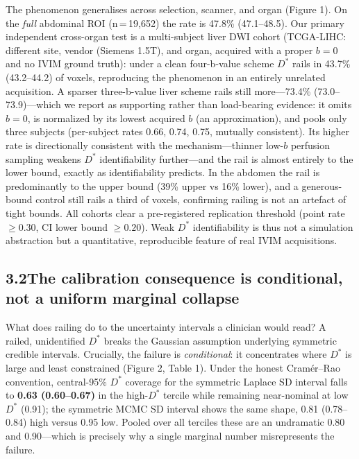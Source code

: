 \documentclass[11pt]{article}
\newcommand{\Dstar}{\ensuremath{D^{*}}}
\begin{document}
The phenomenon generalises across selection, scanner, and organ (Figure 1). On the
\emph{full} abdominal ROI (n\,=\,19{,}652) the rate is 47.8\% (47.1--48.5). Our
primary independent cross-organ test is a multi-subject liver DWI cohort (TCGA-LIHC:
different site, vendor (Siemens 1.5T), and organ, acquired with a proper $b=0$ and no
IVIM ground truth): under a clean four-b-value scheme \Dstar{} rails in 43.7\%
(43.2--44.2) of voxels, reproducing the phenomenon in an entirely unrelated acquisition.
A sparser three-b-value liver scheme rails still more---73.4\% (73.0--73.9)---which we
report as supporting rather than load-bearing evidence: it omits $b=0$, is normalized by
its lowest acquired $b$ (an approximation), and pools only three subjects (per-subject
rates 0.66, 0.74, 0.75, mutually consistent). Its higher rate is directionally consistent
with the mechanism---thinner low-$b$ perfusion sampling weakens \Dstar{} identifiability
further---and the rail is almost entirely to the lower bound, exactly as identifiability
predicts. In the abdomen the rail is predominantly
to the upper bound (39\% upper vs 16\% lower), and a generous-bound control still rails a
third of voxels, confirming railing is not an artefact of tight bounds. All cohorts clear
a pre-registered replication threshold (point rate $\ge 0.30$, CI lower bound
$\ge 0.20$). Weak \Dstar{} identifiability is thus not a simulation abstraction but a
quantitative, reproducible feature of real IVIM acquisitions.

\subsection*{3.2\quad The calibration consequence is conditional, not a uniform marginal collapse}

What does railing do to the uncertainty intervals a clinician would read? A railed,
unidentified \Dstar{} breaks the Gaussian assumption underlying symmetric credible
intervals. Crucially, the failure is \emph{conditional}: it concentrates where \Dstar{}
is large and least constrained (Figure 2, Table 1). Under the honest Cram\'er--Rao
convention, central-95\% \Dstar{} coverage for the symmetric Laplace SD interval falls to
\textbf{0.63 (0.60--0.67)} in the high-\Dstar{} tercile while remaining near-nominal at
low \Dstar{} (0.91); the symmetric MCMC SD interval shows the same shape, 0.81
(0.78--0.84) high versus 0.95 low. Pooled over all terciles these are an undramatic 0.80
and 0.90---which is precisely why a single marginal number misrepresents the failure.
\end{document}
